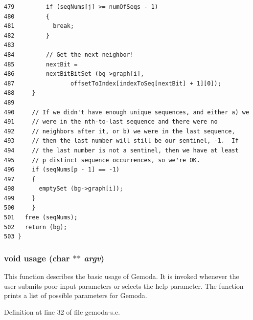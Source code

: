 \begin{verbatim}
479         if (seqNums[j] >= numOfSeqs - 1)
480         {
481           break;
482         }
483       
484         // Get the next neighbor!
485         nextBit =
486         nextBitBitSet (bg->graph[i],
487                offsetToIndex[indexToSeq[nextBit] + 1][0]);
488     }
489       
490     // If we didn't have enough unique sequences, and either a) we
491     // were in the nth-to-last sequence and there were no 
492     // neighbors after it, or b) we were in the last sequence,
493     // then the last number will still be our sentinel, -1.  If
494     // the last number is not a sentinel, then we have at least
495     // p distinct sequence occurrences, so we're OK.
496     if (seqNums[p - 1] == -1)
497     {
498       emptySet (bg->graph[i]);
499     }
500     }
501   free (seqNums);
502   return (bg);
503 }
\end{verbatim}
\normalsize 


\hypertarget{gemoda-s_8c_a0}{
\subsubsection[usage]{\setlength{\rightskip}{0pt plus 5cm}void usage (char $\ast$$\ast$ {\em argv})}}
\label{gemoda-s_8c_a0}


This function describes the basic usage of Gemoda. It is invoked whenever the user submits poor input parameters or selects the help parameter. The function prints a list of possible parameters for Gemoda.

Definition at line 32 of file gemoda-s.c.


